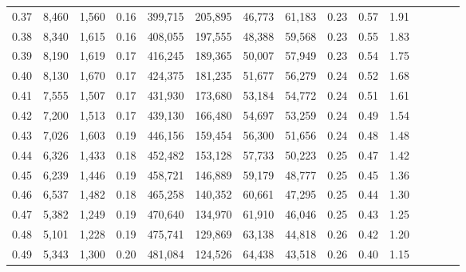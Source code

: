\begin{tabular}{rrrcrrrrrrrrrrr}
0.37 &   8,460 &  1,560 &                                       0.16 &  399,715 &  205,895 &   46,773 &   61,183 &  0.23 &  0.57 &                         1.91 \\
0.38 &   8,340 &  1,615 &                                       0.16 &  408,055 &  197,555 &   48,388 &   59,568 &  0.23 &  0.55 &                         1.83 \\
0.39 &   8,190 &  1,619 &                                       0.17 &  416,245 &  189,365 &   50,007 &   57,949 &  0.23 &  0.54 &                         1.75 \\
0.40 &   8,130 &  1,670 &                                       0.17 &  424,375 &  181,235 &   51,677 &   56,279 &  0.24 &  0.52 &                         1.68 \\
0.41 &   7,555 &  1,507 &                                       0.17 &  431,930 &  173,680 &   53,184 &   54,772 &  0.24 &  0.51 &                         1.61 \\
0.42 &   7,200 &  1,513 &                                       0.17 &  439,130 &  166,480 &   54,697 &   53,259 &  0.24 &  0.49 &                         1.54 \\
0.43 &   7,026 &  1,603 &                                       0.19 &  446,156 &  159,454 &   56,300 &   51,656 &  0.24 &  0.48 &                         1.48 \\
0.44 &   6,326 &  1,433 &                                       0.18 &  452,482 &  153,128 &   57,733 &   50,223 &  0.25 &  0.47 &                         1.42 \\
0.45 &   6,239 &  1,446 &                                       0.19 &  458,721 &  146,889 &   59,179 &   48,777 &  0.25 &  0.45 &                         1.36 \\
0.46 &   6,537 &  1,482 &                                       0.18 &  465,258 &  140,352 &   60,661 &   47,295 &  0.25 &  0.44 &                         1.30 \\
0.47 &   5,382 &  1,249 &                                       0.19 &  470,640 &  134,970 &   61,910 &   46,046 &  0.25 &  0.43 &                         1.25 \\
0.48 &   5,101 &  1,228 &                                       0.19 &  475,741 &  129,869 &   63,138 &   44,818 &  0.26 &  0.42 &                         1.20 \\
0.49 &   5,343 &  1,300 &                                       0.20 &  481,084 &  124,526 &   64,438 &   43,518 &  0.26 &  0.40 &                         1.15 \\

\end{tabular}
